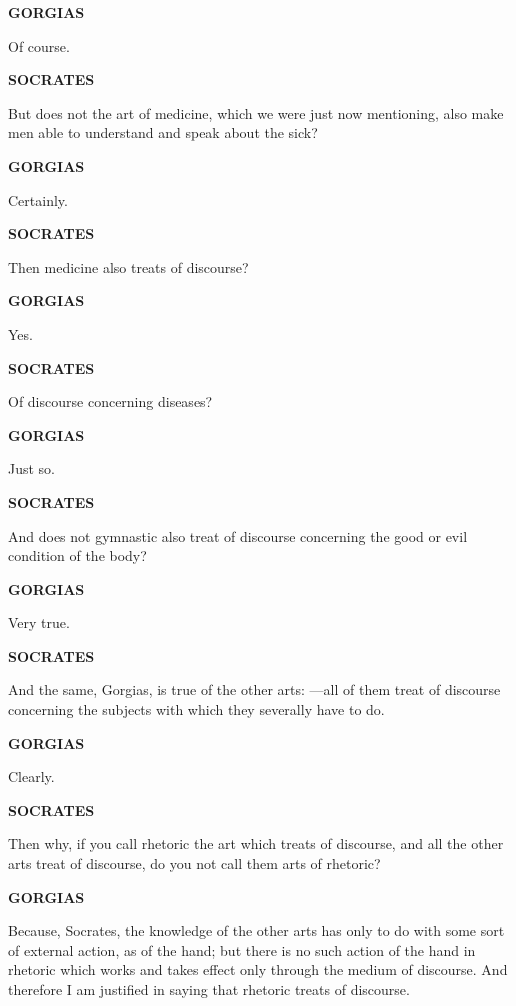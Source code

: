 \documentclass[11pt,letter]{article}
\begin{document}
\par \textbf{GORGIAS}
\par   Of course.

\par \textbf{SOCRATES}
\par   But does not the art of medicine, which we were just now mentioning, also make men able to understand and speak about the sick?

\par \textbf{GORGIAS}
\par   Certainly.

\par \textbf{SOCRATES}
\par   Then medicine also treats of discourse?

\par \textbf{GORGIAS}
\par   Yes.

\par \textbf{SOCRATES}
\par   Of discourse concerning diseases?

\par \textbf{GORGIAS}
\par   Just so.

\par \textbf{SOCRATES}
\par   And does not gymnastic also treat of discourse concerning the good or evil condition of the body?

\par \textbf{GORGIAS}
\par   Very true.

\par \textbf{SOCRATES}
\par   And the same, Gorgias, is true of the other arts: —all of them treat of discourse concerning the subjects with which they severally have to do.

\par \textbf{GORGIAS}
\par   Clearly.

\par \textbf{SOCRATES}
\par   Then why, if you call rhetoric the art which treats of discourse, and all the other arts treat of discourse, do you not call them arts of rhetoric?

\par \textbf{GORGIAS}
\par   Because, Socrates, the knowledge of the other arts has only to do with some sort of external action, as of the hand; but there is no such action of the hand in rhetoric which works and takes effect only through the medium of discourse. And therefore I am justified in saying that rhetoric treats of discourse.
\end{document}
